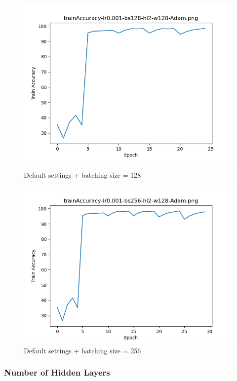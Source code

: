 \documentclass{article}[12pt]
\begin{document}
        \begin{figure}[H]
        \includegraphics[width=\linewidth]{testsResults/trainAccuracy/trainAccuracy-lr0.001-bs128-hl2-w128-Adam.png}
        \caption{Default settings + batching size = 128}
        \endminipage
        \includegraphics[width=\linewidth]{testsResults/trainAccuracy/trainAccuracy-lr0.001-bs256-hl2-w128-Adam.png}
        \caption{Default settings + batching size = 256}
        \endminipage
    \end{figure}

\subsubsection{Number of Hidden Layers}
\end{document}
